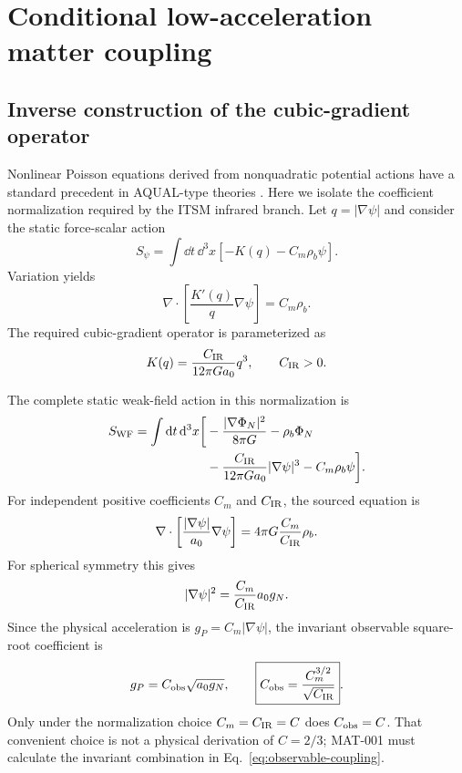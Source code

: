 \section{Conditional low-acceleration matter coupling}

\subsection{Inverse construction of the cubic-gradient operator}

Nonlinear Poisson equations derived from nonquadratic potential actions have a
standard precedent in AQUAL-type theories \cite{bekensteinmilgrom1984}.  Here
we isolate the coefficient normalization required by the ITSM infrared branch.
Let $q=|\nabla\psi|$ and consider the static force-scalar action
\begin{equation}
 S_\psi=\int \dd t\,\dd^3x\left[-K(q)-C_m\rho_b\psi\right].
 \label{eq:static-general}
\end{equation}
Variation yields
\begin{equation}
 \nabla\cdot\left[\frac{K'(q)}{q}\nabla\psi\right]=C_m\rho_b.
 \label{eq:general-field}
\end{equation}
The required cubic-gradient operator is parameterized as
\begin{equation}
 K(q)=\frac{C_{\rm IR}}{12\pi Ga_0}q^3,
 \qquad C_{\rm IR}>0.
 \label{eq:cubic-K}
\end{equation}

The complete static weak-field action in this normalization is
\begin{align}
 S_{\rm WF}=\int \mathrm d t\,\mathrm d^3x\bigg[
 &-\frac{|\nabla\Phi_N|^2}{8\pi G}-\rho_b\Phi_N \nonumber\\
 &-\frac{C_{\rm IR}}{12\pi Ga_0}|\nabla\psi|^3
 -C_m\rho_b\psi\bigg].
 \label{eq:wf-action}
\end{align}
For independent positive coefficients $C_m$ and $C_{\rm IR}$, the sourced
equation is
\begin{equation}
 \nabla\cdot\left[\frac{|\nabla\psi|}{a_0}\nabla\psi\right]
 =4\pi G\frac{C_m}{C_{\rm IR}}\rho_b.
 \label{eq:p3-local}
\end{equation}
For spherical symmetry this gives
\begin{equation}
 |\nabla\psi|^2=\frac{C_m}{C_{\rm IR}}a_0g_N.
 \label{eq:general-gradient}
\end{equation}
Since the physical acceleration is $g_P=C_m|\nabla\psi|$, the invariant
observable square-root coefficient is
\begin{equation}
 g_P=C_{\rm obs}\sqrt{a_0g_N},
 \qquad
 \boxed{C_{\rm obs}=\frac{C_m^{3/2}}{\sqrt{C_{\rm IR}}}}.
 \label{eq:observable-coupling}
\end{equation}
Only under the normalization choice $C_m=C_{\rm IR}=C$ does
$C_{\rm obs}=C$.  That convenient choice is not a physical derivation of
$C=2/3$; MAT-001 must calculate the invariant combination in
Eq.~\eqref{eq:observable-coupling}.

